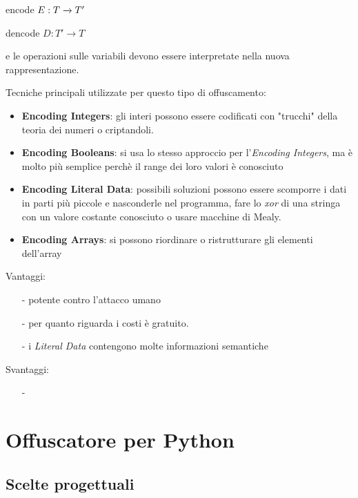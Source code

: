 \documentclass[a4paper,oneside,openright,titlepage,10pt,footinclude,headinclude]{scrbook}
\begin{document}
\begin{center}
encode $ \medskip E: T \xrightarrow{} T'$
\end{center}

\begin{center}
dencode $ D: T' \xrightarrow{} T$
\end{center}

e le operazioni sulle variabili devono essere interpretate nella nuova rappresentazione.

\noindent Tecniche principali utilizzate per questo tipo di offuscamento:
\begin{itemize}
\item
\textbf{Encoding Integers}: gli interi possono essere codificati con "trucchi" della teoria dei numeri o criptandoli.
\item
\textbf{Encoding Booleans}: si usa lo stesso approccio per l'\textit{Encoding Integers}, ma è molto più semplice perchè il range dei loro valori è conosciuto
\item
\textbf{Encoding Literal Data}: possibili soluzioni possono essere scomporre i dati in parti più piccole e nasconderle nel programma, fare lo \textit{xor} di una stringa con un valore costante conosciuto o usare macchine di Mealy.
\item
\textbf{Encoding Arrays}: si possono riordinare o ristrutturare gli elementi dell'array
\end{itemize}


Vantaggi: 
\begin{itemize}
\item[-]
potente contro l'attacco umano
\item[-]
per quanto riguarda i costi è gratuito.
\item[-]
i \textit{Literal Data} contengono molte informazioni semantiche 
\end{itemize}

Svantaggi:
\begin{itemize}
\item[-]
\end{itemize}
 

\chapter{Offuscatore per Python}\label{offuscatore}

\section{Scelte progettuali}\label{offuscatore_scelte}
\end{document}
